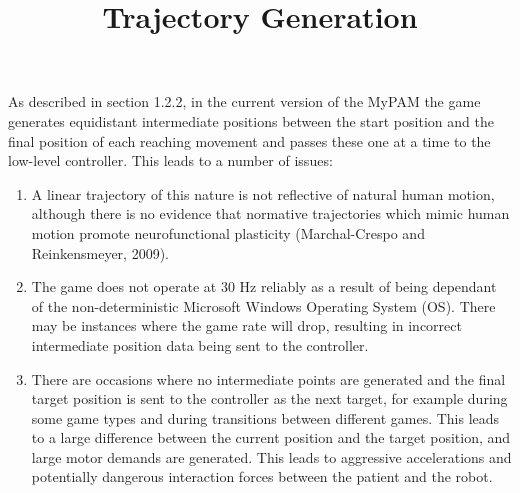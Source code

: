 \documentclass[11pt]{article}
\title{Trajectory Generation}
\date{\vspace{-5ex}} %
\begin{document}
\maketitle
\onehalfspacing
As described in section 1.2.2, in the current version of the MyPAM the game generates equidistant intermediate positions between the start position and the final position of each reaching movement and passes these one at a time to the low-level controller. This leads to a number of issues:
	\begin{enumerate}
	\item A linear trajectory of this nature is not 		reflective of natural human motion, although
	there is no evidence that normative trajectories 		which mimic human motion promote
	neurofunctional plasticity (Marchal-Crespo and 			Reinkensmeyer, 2009).
	\item The game does not operate at 30 Hz reliably 		as a result of being dependant of the
	non-deterministic Microsoft Windows Operating 			System (OS). There may be
	instances where the game rate will drop, resulting 		in incorrect intermediate position
	data being sent to the controller.
	\item There are occasions where no intermediate 		points are generated and the final target
	position is sent to the controller as the next 			target, for example during some game
	types and during transitions between different 			games. This leads to a large difference
	between the current position and the target 			position, and large motor demands are
	generated. This leads to aggressive accelerations 		and potentially dangerous
	interaction forces between the patient and the 			robot.
	\end{enumerate} 
\end{document}
